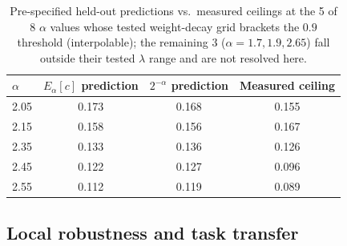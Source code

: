 \documentclass[11pt]{article}
\begin{document}
\begin{table}[t]
\centering
\caption{Pre-specified held-out predictions vs.\ measured ceilings at the 5 of 8 $\alpha$ values whose tested weight-decay grid brackets the $0.9$ threshold (interpolable); the remaining 3 ($\alpha=1.7,1.9,2.65$) fall outside their tested $\lambda$ range and are not resolved here.}
\label{tab:heldout}
\begin{tabular}{lccc}
\toprule
$\alpha$ & $E_\alpha[c]$ prediction & $2^{-\alpha}$ prediction & Measured ceiling \\
\midrule
2.05 & 0.173 & 0.168 & 0.155 \\
2.15 & 0.158 & 0.156 & 0.167 \\
2.35 & 0.133 & 0.136 & 0.126 \\
2.45 & 0.122 & 0.127 & 0.096 \\
2.55 & 0.112 & 0.119 & 0.089 \\
\bottomrule
\end{tabular}
\end{table}

\subsection{Local robustness and task transfer}
\label{sec:results-robustness}
\end{document}
